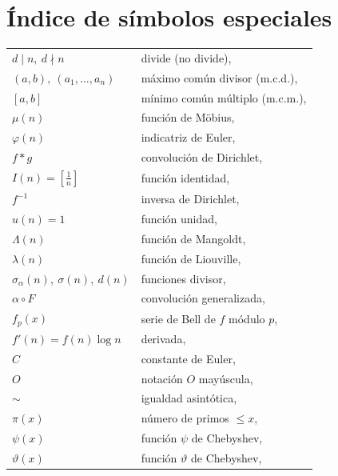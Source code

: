 \documentclass[12pt,a4paper]{book}
\begin{document}
\chapter*{Índice de símbolos especiales}
\begin{longtable}{@{}p{}p{}@{}}
        $d\mid n,\ d\nmid n$ & divide (no divide), \pageref{sim:dvd}\\
        $(a,b),\ (a_{1},\dots,a_{n})$ & máximo común divisor (m.c.d.), \pageref{sim:gcd}\\
        $[a,b]$ & mínimo común múltiplo (m.c.m.), \pageref{sim:lcm}\\
        $\mu(n)$ & función de Möbius, \pageref{sim:mu}\\
        $\varphi(n)$ & indicatriz de Euler, \pageref{sim:phi}\\
        $f*g$ & convolución de Dirichlet, \pageref{sim:conv}\\
        $I(n)=\left[\frac{1}{n}\right]$ & función identidad, \pageref{sim:I}\\
        $f^{-1}$ & inversa de Dirichlet, \pageref{sim:inv}\\
        $u(n)=1$ & función unidad, \pageref{sim:u}\\
        $\Lambda(n)$ & función de Mangoldt, \pageref{sim:Lam}\\
        $\lambda(n)$ & función de Liouville, \pageref{sim:lam}\\
        $\sigma_{\alpha}(n),\ \sigma(n),\ d(n)$ & funciones divisor, \pageref{sim:sig}\\
        $\alpha\circ F$ & convolución generalizada, \pageref{sim:gconv}\\
        $f_{p}(x)$ & serie de Bell de $f$ módulo $p$, \pageref{sim:bell}\\
        $f'(n)=f(n)\log n$ & derivada, \pageref{sim:der}\\
        $C$ & constante de Euler, \pageref{sim:C}\\
        $O$ & notación $O$ mayúscula, \pageref{sim:O}\\
        $\sim$ & igualdad asintótica, \pageref{sim:sim}\\
        $\pi(x)$ & número de primos $\leq x$, \pageref{sim:pi}\\
        $\psi(x)$ & función $\psi$ de Chebyshev, \pageref{sim:psi}\\
        $\vartheta(x)$ & función $\vartheta$ de Chebyshev, \pageref{sim:theta}\\

\end{longtable}
\end{document}
